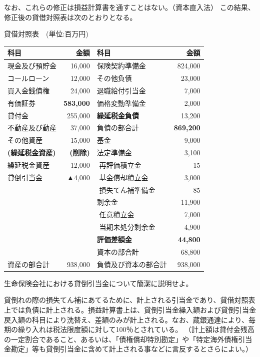 \documentclass[report,gutter=10mm,fore-edge=10mm,uplatex,dvipdfmx]{jlreq}
\begin{document}
なお、これらの修正は損益計算書を通すことはない。（資本直入法）
この結果、修正後の貸借対照表は次のとおりとなる。

貸借対照表   \,\, (単位:百万円)

\begin{tabular}{|l|r||l|r|}
\hline
科目 &  金額 &   科目 & 金額 \\ \hline
現金及び預貯金 & 16,000 & 保険契約準備金 & 824,000 \\
コールローン & 12,000 &その他負債 & 23,000 \\
買入金銭債権 & 24,000 & 退職給付引当金 & 7,000 \\
有価証券 & \textbf{583,000} & 価格変動準備金 & 2,000 \\
貸付金 & 255,000 &  \textbf{繰延税金負債} & 13,200\\
\cline{3-4}
不動産及び動産& 37,000 & 負債の部合計 & \textbf{869,200} \\
\cline{3-4}
その他資産& 15,000 &基金 & 9,000 \\
\textbf{(繰延税金資産)}& \textbf{(削除)}&法定準備金 & 3,100 \\
繰延税金資産& 12,000 &\,\,再評価積立金 & 15 \\
貸倒引当金 & ▲4,000 &\,\,基金償却積立金 & 3,000 \\
 &  &\,\,損失てん補準備金 & 85 \\
 &  &剰余金& 11,900 \\
 &  &\,\,任意積立金 & 7,000 \\
 &  &\,\,当期未処分剰余金 & 4,900 \\
 &  & \textbf{評価差額金} & \textbf{44,800} \\
\cline{3-4}
 &  &資本の部合計& 68,800 \\
\hline
資産の部合計 &  938,000 &負債及び資本の部合計& 938,000 \\
\hline
\end{tabular}



生命保険会社における貸倒引当金について簡潔に説明せよ。


貸倒れの際の損失てん補にあてるために、計上される引当金であり、貸借対照表上では負債に計上される。損益計算書上は、貸倒引当金繰入額および貸倒引当金戻入額の科目により洗替え、差額のみが計上される。なお、蔵銀通達により、毎期の繰り入れは税法限度額に対して100％とされている。
（計上額は貸付金残高の一定割合であること、あるいは、「債権償却特別勘定」や「特定海外債権引当金勘定」等も貸倒引当金に含めて計上される事などに言反するとさらによい。）
\end{document}
